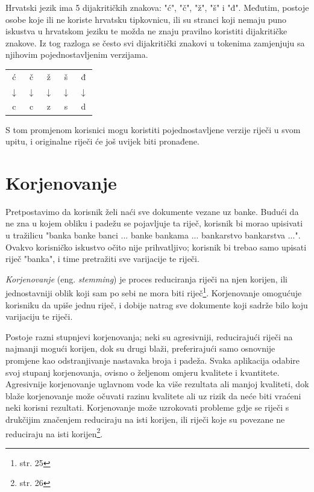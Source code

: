 \documentclass[a4paper,twoside,12pt]{memoir}
\begin{document}
Hrvatski jezik ima 5 dijakritičkih znakova: "ć", "č", "ž", "š" i "đ". Međutim, postoje osobe koje ili ne koriste hrvatsku tipkovnicu, ili su stranci koji nemaju puno iskustva u hrvatskom jeziku te možda ne znaju pravilno koristiti dijakritičke znakove. Iz tog razloga se često svi dijakritički znakovi u tokenima zamjenjuju sa njihovim pojednostavljenim verzijama.

\begin{center}
  \begin{tabular}{ccccc}
    ć            & č            & ž            & š            & đ            \\
    $\downarrow$ & $\downarrow$ & $\downarrow$ & $\downarrow$ & $\downarrow$ \\
    c            & c            & z            & s            & d            \\
  \end{tabular}
\end{center}

S tom promjenom korisnici mogu koristiti pojednostavljene verzije riječi u svom upitu, i originalne riječi će još uvijek biti pronađene.

\section{Korjenovanje}

Pretpostavimo da korisnik želi naći sve dokumente vezane uz banke. Budući da ne zna u kojem obliku i padežu se pojavljuje ta riječ, korisnik bi morao upisivati u tražilicu "banka banke banci ... banke bankama ... bankarstvo bankarstva ...". Ovakvo korisničko iskustvo očito nije prihvatljivo; korisnik bi trebao samo upisati riječ "banka", i time pretražiti sve varijacije te riječi.

\textit{Korjenovanje} (eng. \textit{stemming}) je proces reduciranja riječi na njen korijen, ili jednostavniji oblik koji sam po sebi ne mora biti riječ\footnote{\cite{taming} str. 25}. Korjenovanje omogućuje korisniku da upiše jednu riječ, i dobije natrag sve dokumente koji sadrže bilo koju varijaciju te riječi.

Postoje razni stupnjevi korjenovanja; neki su agresivniji, reducirajući riječi na najmanji mogući korijen, dok su drugi blaži, preferirajući samo osnovnije promjene kao odstranjivanje nastavaka broja i padeža. Svaka aplikacija odabire svoj stupanj korjenovanja, ovisno o željenom omjeru kvalitete i kvantitete. Agresivnije korjenovanje uglavnom vode ka više rezultata ali manjoj kvaliteti, dok blaže korjenovanje može očuvati razinu kvalitete ali uz rizik da neće biti vraćeni neki korisni rezultati. Korjenovanje može uzrokovati probleme gdje se riječi s drukčijim značenjem reduciraju na isti korijen, ili riječi koje su povezane ne reduciraju na isti korijen\footnote{\cite{taming} str. 26}.
\end{document}
